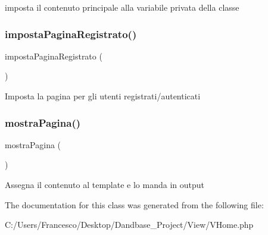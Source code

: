imposta il contenuto principale alla variabile privata della classe \mbox{\label{class_v_home_a19d02ab00682bacf312e22ad6494ceec}} 
\subsubsection{\texorpdfstring{imposta\+Pagina\+Registrato()}{impostaPaginaRegistrato()}}
{\footnotesize\ttfamily imposta\+Pagina\+Registrato (\begin{DoxyParamCaption}{ }\end{DoxyParamCaption})}

Imposta la pagina per gli utenti registrati/autenticati \mbox{\label{class_v_home_a46759d4232bd0607baff37daa710b4fb}} 
\subsubsection{\texorpdfstring{mostra\+Pagina()}{mostraPagina()}}
{\footnotesize\ttfamily mostra\+Pagina (\begin{DoxyParamCaption}{ }\end{DoxyParamCaption})}

Assegna il contenuto al template e lo manda in output 

The documentation for this class was generated from the following file\+:\begin{DoxyCompactItemize}
\item 
C\+:/\+Users/\+Francesco/\+Desktop/\+Dandbase\+\_\+\+Project/\+View/V\+Home.\+php\end{DoxyCompactItemize}
